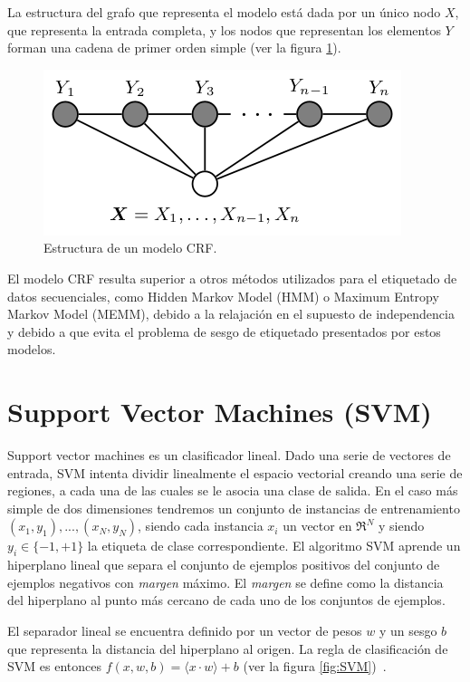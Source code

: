 \documentclass[runningheads,a4paper]{llncs}
\begin{document}
La estructura del grafo que representa el modelo está dada por un único nodo $X$, que representa la entrada completa, y los nodos que representan los elementos $Y$ forman una cadena de primer orden simple (ver la figura \ref{fig:CRF}).

\begin{figure}[ht]
	\centering
	\includegraphics[scale=0.5]{crf.png}
	\caption{Estructura de un modelo CRF.}
	\label{fig:CRF}
\end{figure}

El modelo CRF resulta superior a otros métodos utilizados para el etiquetado de datos secuenciales, como Hidden Markov Model (HMM) o Maximum Entropy Markov Model (MEMM), debido a la relajación en el supuesto de independencia y debido a que evita el problema de sesgo de etiquetado presentados por estos modelos\cite{WALLACH04}.

\section{Support Vector Machines (SVM)}
\label{sec:SVM}

Support vector machines\cite{JOACHIMS99} es un clasificador lineal. Dado una serie de vectores de entrada, SVM intenta dividir linealmente el espacio vectorial creando una serie de regiones, a cada una de las cuales se le asocia una clase de salida. En el caso más simple de dos dimensiones tendremos un conjunto de instancias de entrenamiento ${(x_1, y_1),...,(x_N,y_N)}$, siendo cada instancia $x_i$ un vector en $\Re^N$ y siendo $y_i \in \lbrace-1,+1\rbrace$ la etiqueta de clase correspondiente. El algoritmo SVM aprende un hiperplano lineal que separa el conjunto de ejemplos positivos del conjunto de ejemplos negativos con \emph{margen} máximo. El \emph{margen} se define como la distancia del hiperplano al punto más cercano de cada uno de los conjuntos de ejemplos.

El separador lineal se encuentra definido por un vector de pesos $w$ y un sesgo $b$ que representa la distancia del hiperplano al origen. La regla de clasificación de SVM es entonces $f(x,w,b)=\langle x \cdot w \rangle+b$ (ver la figura \ref{fig:SVM})~\cite{MATA07}.
\end{document}
